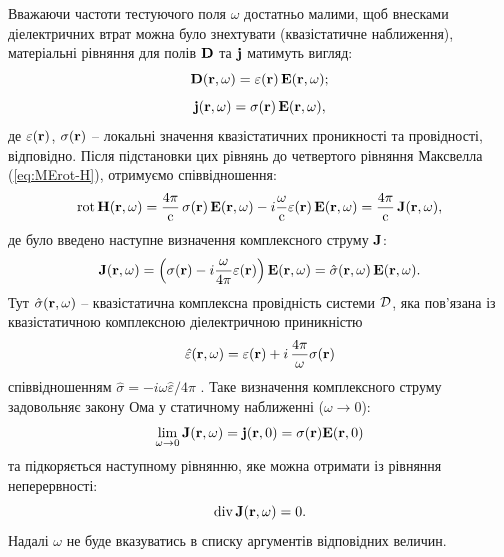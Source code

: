 \documentclass[14pt,twoside]{vakthesis}
\begin{document}
Вважаючи частоти тестуючого поля $\omega$ достатньо малими, щоб внесками діелектричних втрат можна було знехтувати (квазістатичне наближення), матеріальні рівняння для полів ${\bf D}$ та ${\bf j}$ матимуть вигляд:
\begin{equation}\label{eq:materialEquation-D}
{\bf D}({\bf r}, \omega) = \varepsilon({\bf r})\,{\bf E}({\bf r}, \omega);
\end{equation}
\begin{equation}\label{eq:materialEquation-j}
{\bf j}({\bf r}, \omega) = \sigma({\bf r})\,{\bf E}({\bf r}, \omega),
\end{equation}
де $\varepsilon({\bf r})$, $\sigma({\bf r})$ -- локальні значення квазістатичних проникності та провідності, відповідно. 
Після підстановки цих рівнянь до четвертого рівняння Максвелла (\ref{eq:MErot-H}), отримуємо співвідношення:
\begin{equation}\label{eq:MErot-H-material}
{\rm rot}\,{\bf H}({\bf r}, \omega) = \frac{4\pi}{\rm c}\,\sigma({\bf r})\,{\bf E}({\bf r}, \omega) - i\frac{\omega}{\rm c} \varepsilon({\bf r})\, {\bf E}({\bf r}, \omega) = \frac{4\pi}{\rm c}\,{\bf J}({\bf r}, \omega),
\end{equation}
де було введено наступне визначення комплексного струму ${\bf J}$:
\begin{equation}\label{eq:ComplexCurrent-J}
{\bf J}({\bf r}, \omega) = \left(\sigma({\bf r}) - i\frac{\omega}{4\pi} \varepsilon({\bf r}) \right) {\bf E}({\bf r}, \omega) = \hat{\sigma}({\bf r}, \omega)\,{\bf E}({\bf r}, \omega).
\end{equation}
Тут $\hat{\sigma}({\bf r}, \omega)$ --  квазістатична комплексна провідність системи $\cal D$, яка пов'язана із квазістатичною комплексною діелектричною приникністю~\cite{LandauT8}
\begin{equation}\label{eq:eps_complex}
\hat{\varepsilon}({\bf r}, \omega) = \varepsilon ({\bf r}) + i\,\frac{4\pi}{\omega}\sigma({\bf r})
\end{equation}
співвідношенням $\hat{\sigma} = -i\omega {\hat\varepsilon}/4\pi$ \cite{broadband}.
Таке визначення комплексного струму задовольняє закону Ома у статичному наближенні ($\omega\to 0$):
$$
\lim\limits_{\omega \to 0} {\bf J}({\bf r},\omega) = {\bf j}({\bf r}, 0) = \sigma({\bf r}) {\bf E}({\bf r}, 0)
$$
та підкоряється наступному рівнянню, яке можна отримати із рівняння неперервності:
\begin{equation}\label{eq:ComplexCurrent-div}
{\rm div}\,{\bf J}({\bf r}, \omega) = 0.
\end{equation} 
Надалі $\omega$ не буде вказуватись в списку аргументів відповідних величин.
\end{document}
